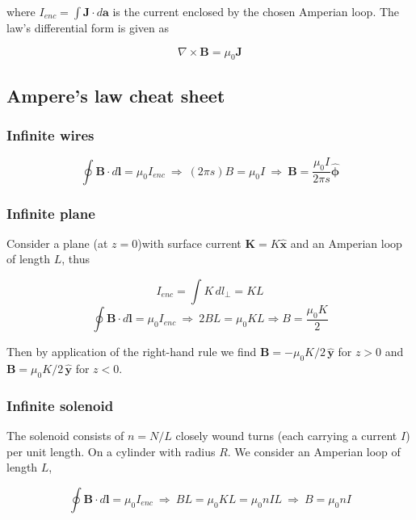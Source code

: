 \documentclass[a4paper]{article}
\begin{document}
where $I_{enc}=\int \bm{J}\cdot d\bm{a}$ is the current enclosed by the chosen Amperian loop. The law's differential form is given as

\begin{equation}
    \nabla\times\bm{B}=\mu_0\bm{J}
\end{equation}

\subsection{Ampere's law cheat sheet}

\subsubsection*{Infinite wires}
\begin{equation}
    \oint \bm{B}\cdot d\bm{l} = \mu_0 I_{enc}\ \Rightarrow\ (2\pi s)B=\mu_0 I\ \Rightarrow\ \bm{B}=\frac{\mu_0 I}{2\pi s}\hat{\bm{\phi}}
\end{equation}
\subsubsection*{Infinite plane}
Consider a plane (at $z=0$)with surface current $\bm{K}=K\hat{\bm{x}}$ and an Amperian loop of length $L$, thus

\begin{equation}
    I_{enc}=\int K\,dl_{\perp} = KL
\end{equation}
\begin{equation}
    \oint \bm{B}\cdot d\bm{l} = \mu_0 I_{enc}\ \Rightarrow\ 2BL=\mu_0 K L \Rightarrow B = \frac{\mu_0 K}{2}
\end{equation}

Then by application of the right-hand rule we find $\bm{B}=-\mu_0 K/2\,\hat{\bm{y}}$ for $z>0$ and $\bm{B}=\mu_0 K/2\,\hat{\bm{y}}$ for $z<0$.

\subsubsection*{Infinite solenoid}
The solenoid consists of $n=N/L$ closely wound turns (each carrying a current $I$) per unit length. On a cylinder with radius $R$. We consider an Amperian loop of length $L$,

\begin{equation}
    \oint \bm{B}\cdot d\bm{l} = \mu_0 I_{enc}\ \Rightarrow\ BL=\mu_0KL=\mu_0nIL \ \Rightarrow\ B=\mu_0nI
\end{equation}
\end{document}
